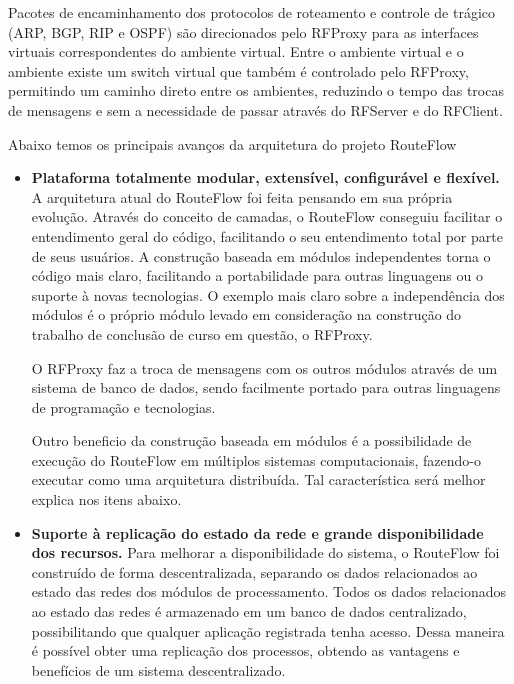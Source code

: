 Pacotes de encaminhamento dos protocolos de roteamento 
e controle de trágico (ARP, BGP, RIP e OSPF) são direcionados
pelo RFProxy para as interfaces virtuais correspondentes do
ambiente virtual. Entre o ambiente virtual e o ambiente existe
um switch virtual que também é controlado pelo RFProxy,
permitindo um caminho direto entre os ambientes, reduzindo 
o tempo das trocas de mensagens e sem a necessidade de passar
através do RFServer e do RFClient.

Abaixo temos os principais avanços da arquitetura do projeto
RouteFlow

\begin{itemize}
\item \textbf{Plataforma totalmente modular, extensível, 
configurável e flexível.} A arquitetura atual do RouteFlow 
foi feita pensando em sua própria evolução. Através do 
conceito de camadas, o RouteFlow conseguiu facilitar o entendimento
geral do código, facilitando o seu entendimento total por parte de 
seus usuários. A construção baseada em módulos independentes
torna o código mais claro, facilitando a portabilidade para outras 
linguagens ou o suporte à novas tecnologias. O exemplo mais 
claro sobre a independência dos módulos é o próprio módulo levado em consideração
na construção do trabalho de conclusão de curso em questão, o
RFProxy. 

O RFProxy faz a troca de mensagens com os outros módulos 
através de um sistema de banco de dados, sendo facilmente
portado para outras linguagens de programação e tecnologias.

Outro beneficio da construção baseada em módulos é a possibilidade
de execução do RouteFlow em múltiplos sistemas computacionais, 
fazendo-o executar como uma arquitetura distribuída. Tal 
característica será melhor explica nos itens abaixo.
\item \textbf{Suporte à replicação do estado da rede e grande
disponibilidade dos recursos.} Para melhorar a disponibilidade
do sistema, o RouteFlow foi construído de forma descentralizada, 
separando os dados relacionados ao estado das redes dos módulos de processamento.
Todos os dados relacionados ao estado das redes é armazenado
em um banco de dados centralizado, possibilitando que qualquer aplicação 
registrada tenha acesso. Dessa maneira é possível obter uma 
replicação dos processos, obtendo as vantagens e benefícios
de um sistema descentralizado. 


\end{itemize}
